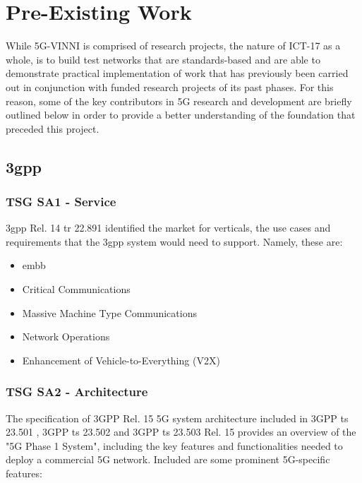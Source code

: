 \newpage

\section{Pre-Existing Work}
While 5G-VINNI is comprised of research projects, the nature of ICT-17 as a whole, is to build test networks that are standards-based and are able to demonstrate practical implementation of work that has previously been carried out in conjunction with funded research projects of its past phases. For this reason, some of the key contributors in 5G research and development are briefly outlined below in order to provide a better understanding of the foundation that preceded this project.

    \subsection{\acrlong{3gpp}}    
    \label{chap:3gpp-rel15}
        \subsubsection{TSG SA1 - Service}
        \acrfull{3gpp} Rel. 14 \acrfull{tr} 22.891 \cite{3GPP_TR_22.891} identified the market for verticals, the use cases and requirements that the \acrshort{3gpp} system would need to support. Namely, these are:
        
        \begin{itemize}
          \item \acrfull{embb}
          \item Critical Communications
          \item Massive Machine Type Communications
          \item Network Operations
          \item Enhancement of Vehicle-to-Everything (V2X)
        \end{itemize}

        \subsubsection{TSG SA2 - Architecture}
        The specification of 3GPP Rel. 15 5G system architecture included in 3GPP \acrfull{ts} 23.501 \cite{3GPP_TS_23.501}, 3GPP \acrshort{ts} 23.502 \cite{3GPP_TS_23.502} and 3GPP \acrshort{ts} 23.503 \cite{3GPP_TS_23.503} Rel. 15 provides an overview of the "5G Phase 1 System", including the key features and functionalities needed to deploy a commercial 5G network. Included are some prominent 5G-specific features:

